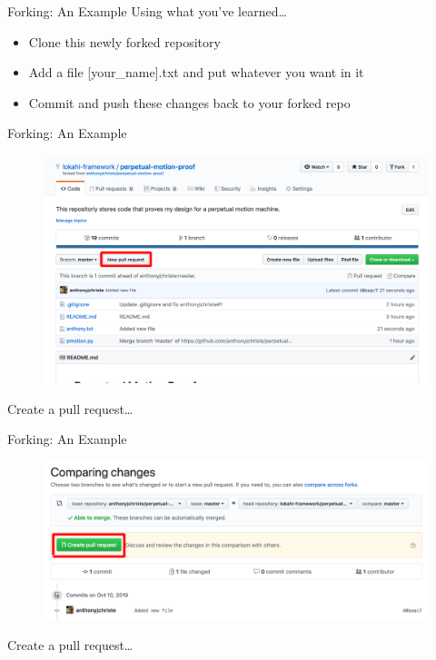 \documentclass{beamer}
\begin{document}
    \begin{frame}{Forking: An Example}
        Using what you've learned\ldots
        \begin{itemize}
            \item Clone this newly forked repository
            \item Add a file [your\_name].txt and put whatever you want in it
            \item Commit and push these changes back to your forked repo
        \end{itemize}
    \end{frame}

    \begin{frame}{Forking: An Example}
        \begin{figure}
            \centering
            \includegraphics[width=\textwidth]{figures/pr.png}
        \end{figure}
        \centering
        Create a pull request\ldots
    \end{frame}

    \begin{frame}{Forking: An Example}
        \begin{figure}
            \centering
            \includegraphics[width=\textwidth]{figures/pr_2.png}
        \end{figure}
        \centering
        Create a pull request\ldots
    \end{frame}
\end{document}
